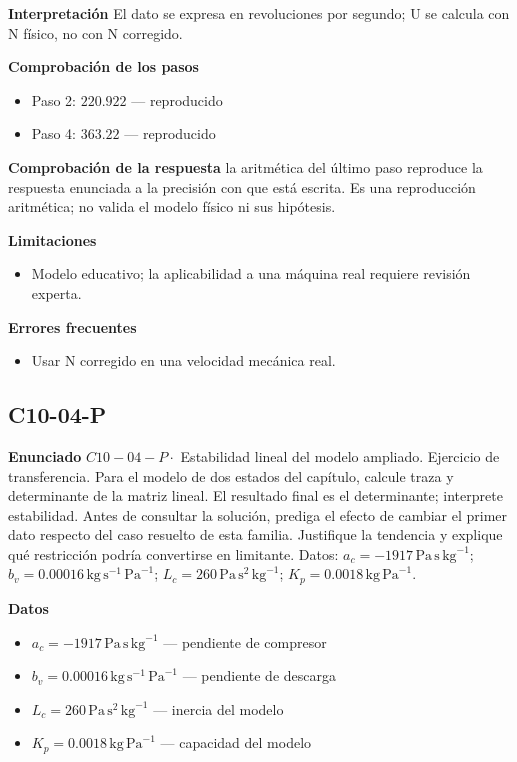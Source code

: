 \documentclass[10pt,openany]{book}
\begin{document}
\noindent\textbf{Interpretación}
El dato se expresa en revoluciones por segundo; U se calcula con N físico, no con N corregido.

\noindent\textbf{Comprobación de los pasos}
\begin{itemize}
\item Paso 2: $220.922$ — reproducido
\item Paso 4: $363.22$ — reproducido
\end{itemize}

\noindent\textbf{Comprobación de la respuesta} la aritmética del último paso reproduce la respuesta enunciada a la precisión con que está escrita. Es una reproducción aritmética; no valida el modelo físico ni sus hipótesis.

\noindent\textbf{Limitaciones}
\begin{itemize}
\item Modelo educativo; la aplicabilidad a una máquina real requiere revisión experta.
\end{itemize}

\noindent\textbf{Errores frecuentes}
\begin{itemize}
\item Usar N corregido en una velocidad mecánica real.
\end{itemize}
\subsection*{C10-04-P}

\noindent\textbf{Enunciado}
\(C10-04-P \cdot\) Estabilidad lineal del modelo ampliado. Ejercicio de transferencia. Para el modelo de dos estados del capítulo, calcule traza y determinante de la matriz lineal. El resultado final es el determinante; interprete estabilidad. Antes de consultar la solución, prediga el efecto de cambiar el primer dato respecto del caso resuelto de esta familia. Justifique la tendencia y explique qué restricción podría convertirse en limitante. Datos: \(a_c=-1917\, \mathrm{Pa}\,\mathrm{s}\,\mathrm{kg}^{-1}\); \(b_v=0.00016\, \mathrm{kg}\,\mathrm{s}^{-1}\,\mathrm{Pa}^{-1}\); \(L_c=260\, \mathrm{Pa}\,\mathrm{s}^{2}\,\mathrm{kg}^{-1}\); \(K_p=0.0018\, \mathrm{kg}\,\mathrm{Pa}^{-1}\).

\noindent\textbf{Datos}
\begin{itemize}
\item $a_c = -1917\,\mathrm{Pa}\,\mathrm{s}\,\mathrm{kg}^{-1}$ — pendiente de compresor
\item $b_v = 0.00016\,\mathrm{kg}\,\mathrm{s}^{-1}\,\mathrm{Pa}^{-1}$ — pendiente de descarga
\item $L_c = 260\,\mathrm{Pa}\,\mathrm{s}^{2}\,\mathrm{kg}^{-1}$ — inercia del modelo
\item $K_p = 0.0018\,\mathrm{kg}\,\mathrm{Pa}^{-1}$ — capacidad del modelo
\end{itemize}
\end{document}
